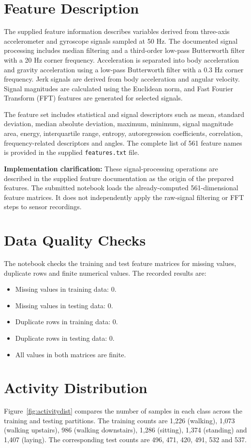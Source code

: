 \section{Feature Description}
The supplied feature information describes variables derived from three-axis accelerometer and gyroscope signals sampled at 50 Hz. The documented signal processing includes median filtering and a third-order low-pass Butterworth filter with a 20 Hz corner frequency. Acceleration is separated into body acceleration and gravity acceleration using a low-pass Butterworth filter with a 0.3 Hz corner frequency. Jerk signals are derived from body acceleration and angular velocity. Signal magnitudes are calculated using the Euclidean norm, and Fast Fourier Transform (FFT) features are generated for selected signals.

The feature set includes statistical and signal descriptors such as mean, standard deviation, median absolute deviation, maximum, minimum, signal magnitude area, energy, interquartile range, entropy, autoregression coefficients, correlation, frequency-related descriptors and angles. The complete list of 561 feature names is provided in the supplied \texttt{features.txt} file.

\textbf{Implementation clarification:} These signal-processing operations are described in the supplied feature documentation as the origin of the prepared features. The submitted notebook loads the already-computed 561-dimensional feature matrices. It does not independently apply the raw-signal filtering or FFT steps to sensor recordings.

\section{Data Quality Checks}
The notebook checks the training and test feature matrices for missing values, duplicate rows and finite numerical values. The recorded results are:
\begin{itemize}
\item Missing values in training data: 0.
\item Missing values in testing data: 0.
\item Duplicate rows in training data: 0.
\item Duplicate rows in testing data: 0.
\item All values in both matrices are finite.
\end{itemize}

\section{Activity Distribution}
Figure~\ref{fig:activitydist} compares the number of samples in each class across the training and testing partitions. The training counts are 1,226 (walking), 1,073 (walking upstairs), 986 (walking downstairs), 1,286 (sitting), 1,374 (standing) and 1,407 (laying). The corresponding test counts are 496, 471, 420, 491, 532 and 537.

